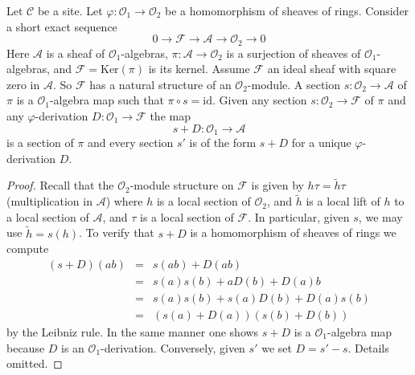 \begin{lemma}
\label{lemma-double-structure-gives-derivation}
Let $\mathcal{C}$ be a site. Let $\varphi : \mathcal{O}_1 \to \mathcal{O}_2$
be a homomorphism of sheaves of rings.
Consider a short exact sequence
$$
0 \to \mathcal{F} \to \mathcal{A} \to \mathcal{O}_2 \to 0
$$
Here $\mathcal{A}$ is a sheaf of $\mathcal{O}_1$-algebras,
$\pi : \mathcal{A} \to \mathcal{O}_2$ is a surjection
of sheaves of $\mathcal{O}_1$-algebras, and
$\mathcal{F} = \text{Ker}(\pi)$ is its kernel. Assume $\mathcal{F}$ an ideal
sheaf with square zero in $\mathcal{A}$. So $\mathcal{F}$
has a natural structure of an $\mathcal{O}_2$-module.
A section $s : \mathcal{O}_2 \to \mathcal{A}$ of $\pi$
is a $\mathcal{O}_1$-algebra map such that $\pi \circ s = \text{id}$.
Given any section $s : \mathcal{O}_2 \to \mathcal{F}$
of $\pi$ and any $\varphi$-derivation $D : \mathcal{O}_1 \to \mathcal{F}$
the map
$$
s + D : \mathcal{O}_1 \to \mathcal{A}
$$
is a section of $\pi$ and every section $s'$ is of the form $s + D$
for a unique $\varphi$-derivation $D$.
\end{lemma}

\begin{proof}
Recall that the $\mathcal{O}_2$-module structure on $\mathcal{F}$
is given by $h \tau = \tilde h \tau$ (multiplication in $\mathcal{A}$)
where $h$ is a local section of $\mathcal{O}_2$, and
$\tilde h$ is a local lift of $h$ to a local
section of $\mathcal{A}$, and $\tau$ is a local section of $\mathcal{F}$.
In particular, given $s$, we may use $\tilde h = s(h)$.
To verify that $s + D$ is a homomorphism of sheaves of rings we
compute
\begin{eqnarray*}
(s + D)(ab) & = & s(ab) + D(ab) \\
& = & s(a)s(b) + aD(b) + D(a)b \\
& = & s(a) s(b) + s(a)D(b) + D(a)s(b) \\
& = & (s(a) + D(a))(s(b) + D(b))
\end{eqnarray*}
by the Leibniz rule. In the same manner one shows
$s + D$ is a $\mathcal{O}_1$-algebra map because $D$ is
an $\mathcal{O}_1$-derivation. Conversely, given $s'$ we set
$D = s' - s$. Details omitted.
\end{proof}

